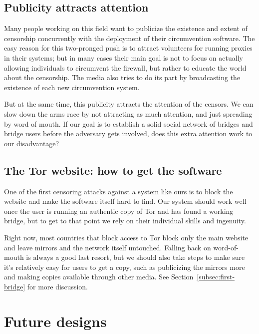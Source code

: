 \documentclass{llncs}
\begin{document}

\subsection{Publicity attracts attention}
\label{subsec:publicity}

Many people working on this field want to publicize the existence
and extent of censorship concurrently with the deployment of their
circumvention software. The easy reason for this two-pronged push is
to attract volunteers for running proxies in their systems; but in many
cases their main goal is not to focus on actually allowing individuals
to circumvent the firewall, but rather to educate the world about the
censorship. The media also tries to do its part by broadcasting the
existence of each new circumvention system.

But at the same time, this publicity attracts the attention of the
censors. We can slow down the arms race by not attracting as much
attention, and just spreading by word of mouth. If our goal is to
establish a solid social network of bridges and bridge users before
the adversary gets involved, does this extra attention work to our
disadvantage?

\subsection{The Tor website: how to get the software}

One of the first censoring attacks against a system like ours is to
block the website and make the software itself hard to find. Our system
should work well once the user is running an authentic
copy of Tor and has found a working bridge, but to get to that point
we rely on their individual skills and ingenuity.

Right now, most countries that block access to Tor block only the main
website and leave mirrors and the network itself untouched.
Falling back on word-of-mouth is always a good last resort, but we should
also take steps to make sure it's relatively easy for users to get a copy,
such as publicizing the mirrors more and making copies available through
other media.
See Section~\ref{subsec:first-bridge} for more discussion.

\section{Future designs}
\label{sec:future}
\end{document}
